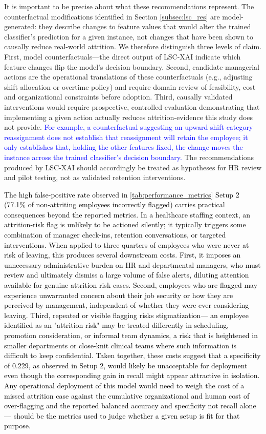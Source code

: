 \documentclass[a4paper,fleqn]{cas-sc}
\begin{document}
It is important to be precise about what these recommendations represent. The counterfactual modifications identified in Section \ref{subsec:lsc_res} are model-generated: they describe changes to feature values that would alter the trained classifier's prediction for a given instance, not changes that have been shown to causally reduce real-world attrition. We therefore distinguish three levels of claim. First, model counterfactuals—the direct output of LSC-XAI indicate which feature changes flip the model's decision boundary. Second, candidate managerial actions are the operational translations of these counterfactuals (e.g., adjusting shift allocation or overtime policy) and require domain review of feasibility, cost and organizational constraints before adoption. Third, causally validated interventions would require prospective, controlled evaluation demonstrating that implementing a given action actually reduces attrition-evidence this study does not provide. \textcolor{blue}{For example, a counterfactual suggesting an upward shift-category reassignment does not establish that reassignment will retain the employee; it only establishes that, holding the other features fixed, the change moves the instance across the trained classifier's decision boundary.} The recommendations produced by LSC-XAI should accordingly be treated as hypotheses for HR review and pilot testing, not as validated retention interventions.

\textcolor{black}{The high false-positive rate observed in \cref{tab:performance_metrics} Setup 2 (77.1\% of non-attriting employees incorrectly flagged) carries practical consequences beyond the reported metrics. In a healthcare staffing context, an attrition-risk flag is unlikely to be actioned silently; it typically triggers some combination of manager check-ins, retention conversations, or targeted interventions. When applied to three-quarters of employees who were never at risk of leaving, this produces several downstream costs. First, it imposes an unnecessary administrative burden on HR and departmental managers, who must review and ultimately dismiss a large volume of false alerts, diluting attention available for genuine attrition risk cases. Second, employees who are flagged may experience unwarranted concern about their job security or how they are perceived by management, independent of whether they were ever considering leaving. Third, repeated or visible flagging risks stigmatization— an employee identified as an "attrition risk" may be treated differently in scheduling, promotion consideration, or informal team dynamics, a risk that is heightened in smaller departments or close-knit clinical teams where such information is difficult to keep confidential. Taken together, these costs suggest that a specificity of 0.229, as observed in Setup 2, would likely be unacceptable for deployment even though the corresponding gain in recall might appear attractive in isolation. Any operational deployment of this model would need to weigh the cost of a missed attrition case against the cumulative organizational and human cost of over-flagging and the reported balanced accuracy and specificity not recall alone — should be the metrics used to judge whether a given setup is fit for that purpose.}
\end{document}
